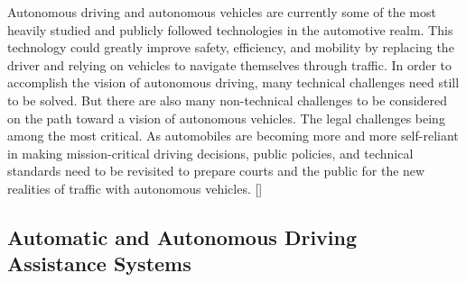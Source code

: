 \documentclass{article}
\begin{document}
Autonomous driving and autonomous vehicles are currently some of the most heavily studied and publicly followed technologies in the automotive realm. This technology could greatly improve safety, efficiency, and mobility by replacing the driver and relying on vehicles to navigate themselves through traffic. In order to accomplish the vision of autonomous driving, many technical challenges need still to be solved. But there are also many non-technical challenges to be considered on the path toward a vision of autonomous vehicles. The legal challenges being among the most critical. As automobiles are becoming more and more self-reliant in making mission-critical driving decisions, public policies, and technical standards need to be revisited to prepare courts and the public for the new realities of traffic with autonomous vehicles. [\textcite{beiker2012legal}]

\subsection{Automatic and Autonomous Driving Assistance Systems}
\end{document}
